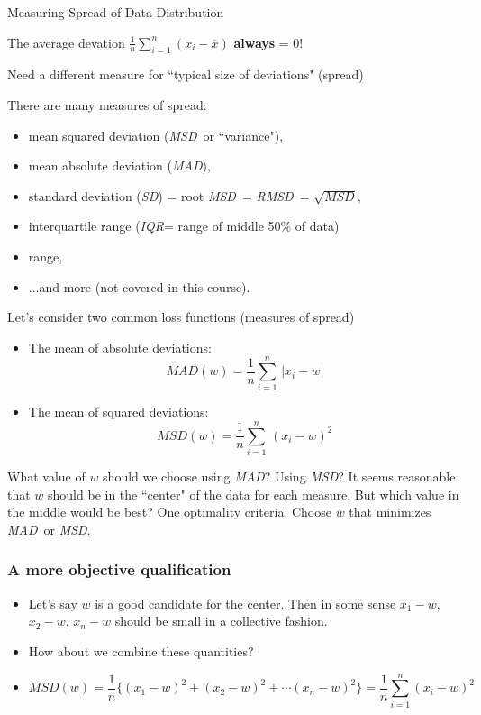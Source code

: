 \documentclass{beamer}\usepackage[]{graphicx}\usepackage[]{color}
\newcommand{\xbar}{\overline{x}}
\newcommand{\IQR}{\textit{IQR}}
\newcommand{\MAD}{\textit{MAD}}
\newcommand{\MSD}{\textit{MSD}}
\newcommand{\RMSD}{\textit{RMSD}}
\begin{document}
\begin{frame}{Measuring Spread of Data Distribution\;\;}
\vspace{0.25cm}

The average devation
$\displaystyle{
\frac{1}{n}  \sum_{i=1}^n (x_i - \xbar) 
}$
\;\textbf{always} = 0!

Need a different measure for ``typical size of deviations"  (spread)
\vskip0.35cm

There are many measures of spread: 
\begin{itemize}
\item
mean squared deviation (\MSD\ or ``variance"), 
\item
mean absolute deviation (\MAD),
\item
standard deviation (\textit{SD}) = root \MSD\ = \RMSD\ = $\sqrt{MSD}$, 
\item
interquartile range (\IQR = range of middle 50\% of data) 
\item range,
\item ...and more (not covered in this course).
\end{itemize}

\newpage

Let's consider two common loss functions (measures of spread)
\begin{itemize}
\item The mean of absolute deviations: 
$$MAD(w) = \frac{1}{n} \sum_{i=1}^n\, |x_i-w|$$
\item The mean of squared deviations: 
$$MSD(w) = \frac{1}{n} \sum_{i=1}^n\, (x_i-w)^2$$
\end{itemize}
What value of $w$ should we choose using \MAD?  Using \MSD? 
\vskip0.2cm
It seems reasonable that $w$ should be in the ``center" of the data
for each measure.  But which value in the middle would be best?
\vskip0.2cm
One optimality criteria: Choose $w$ that 
minimizes \MAD\ or \MSD.

\end{frame}

\begin{frame}
\frametitle{A more objective qualification}
\begin{itemize}
\item Let's say $w$ is a good candidate for the center. Then in some sense $x_1-w$, $x_2-w$, $x_n-w$ should be small in a collective fashion. 
\item How about we combine these quantities?
\item $$MSD(w)=\frac{1}{n} \{  (x_1-w)^2+(x_2-w)^2+\cdots (x_n-w)^2 \}=\frac{1}{n}\sum_{i=1}^n(x_i-w)^2$$
\end{itemize}
\end{frame}
\end{document}
